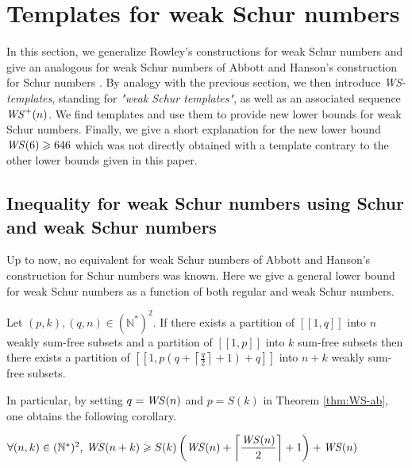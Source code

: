 \section{Templates for weak Schur numbers}
\label{WeakSchur}

In this section, we generalize Rowley's constructions for weak Schur numbers \cite{RowleyWS} and give an analogous
for weak Schur numbers of Abbott and Hanson's construction for Schur numbers \cite{AbbottHanson}. By analogy with the previous section,
we then introduce \textit{WS-templates}, standing for \textit{"weak Schur templates"}, as well as an associated sequence \(\mathit{WS}^+(n)\). 
We find templates and use them to provide new lower bounds for weak Schur numbers. Finally, we give a short explanation for 
the new lower bound \(\mathit{WS}(6) \geqslant 646\) which was not directly obtained with a template contrary to the other lower bounds 
given in this paper.

\subsection{Inequality for weak Schur numbers using Schur and weak Schur numbers}

Up to now, no equivalent for weak Schur numbers of Abbott and Hanson's construction for Schur numbers
\cite{AbbottHanson} was known. Here we give a general lower bound for weak Schur numbers as a function of both
regular and weak Schur numbers.

\begin{theorem}
\label{thm:WS-ab}
\begin{sloppypar}
Let \((p,k), (q,n) \in (\mathbb{N}^*)^2\). If there exists a partition of \([\![1,q]\!]\) into \(n\) weakly sum-free
subsets and a partition of \([\![1,p]\!]\) into \(k\) sum-free
subsets then there exists a partition of \({[\![1,p(q+\left \lceil \frac{q}{2} \right \rceil + 1)+q]\!]}\) into \(n+k\)
weakly sum-free subsets.
\end{sloppypar}
\end{theorem}

In particular, by setting \(q = \mathit{WS} (n)\) and \(p = S(k)\) in Theorem \ref{thm:WS-ab}, one obtains the following corollary.

\begin{corollary}
\label{cor:ineqWS-S}
\( \forall (n,k) \in (\mathbb{N}^*)^2 \text{, } \mathit{WS} (n+k) \geqslant S(k) \left (\mathit{WS} (n) + \left \lceil \displaystyle \frac{\mathit{WS} (n)}{2}
\right \rceil +1 \right) + \mathit{WS} (n)\)
\end{corollary}

